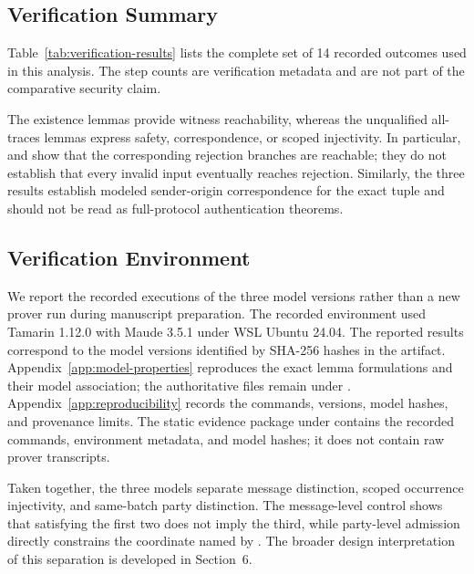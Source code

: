 \subsection{Verification Summary}

Table~\ref{tab:verification-results} lists the complete set of 14 recorded
outcomes used in this analysis. The step counts are verification metadata and
are not part of the comparative security claim.



The existence lemmas provide witness reachability, whereas the unqualified
all-traces lemmas express safety, correspondence, or scoped injectivity. In
particular,  and
 show that the corresponding rejection
branches are reachable; they do not establish that every invalid input
eventually reaches rejection. Similarly, the three
 results establish modeled sender-origin
correspondence for the exact tuple and should not be read as full-protocol
authentication theorems.

\subsection{Verification Environment}

We report the recorded executions of the three model versions rather than a
new prover run during manuscript preparation. The recorded environment used
Tamarin 1.12.0 with Maude 3.5.1 under WSL Ubuntu 24.04. The reported results
correspond to the model versions identified by SHA-256 hashes in the artifact.
Appendix~\ref{app:model-properties} reproduces the exact lemma formulations
and their model association; the authoritative files remain under
. Appendix~\ref{app:reproducibility} records the
commands, versions, model hashes, and provenance limits. The static evidence package under
 contains the recorded commands, environment
metadata, and model hashes; it does not contain raw prover transcripts.

Taken together, the three models separate message distinction, scoped
occurrence injectivity, and same-batch party distinction. The message-level control shows
that satisfying the first two does not imply the third, while party-level
admission directly constrains the coordinate named by \distinctparty. The
broader design interpretation of this separation is developed in Section~6.

\FloatBarrier
